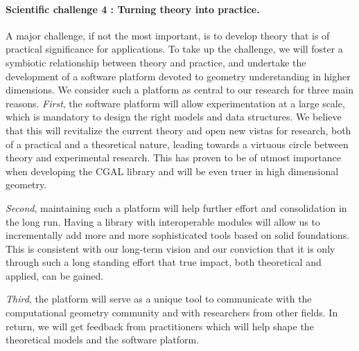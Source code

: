 \paragraph{Scientific challenge 4 : Turning theory into practice.}%
A major challenge, if not the most important, is to develop theory that is of practical significance for applications.   To take up the challenge, we will foster a symbiotic relationship between theory and practice, and  undertake the development of a software platform devoted to geometry understanding in higher dimensions. 
We consider such a platform as central to our research  for three main reasons.  {\em First}, the software platform will allow experimentation at a large scale, which is mandatory to design the right models and data structures. We believe that this will revitalize the current theory and open new vistas for research, both of a practical and a theoretical nature, leading towards a virtuous circle between theory and experimental research. This has proven to be of utmost importance
when developing the CGAL library and will be even truer in high dimensional geometry.

{\em Second}, maintaining such a platform will help further effort and consolidation in the long run.  Having a library with interoperable modules will allow us to incrementally add more and more sophisticated tools based on solid foundations.  This is consistent with our long-term vision and our conviction that it is only through such a long standing effort that true impact, both theoretical and applied, can be gained.

{\em Third}, the platform will serve as a unique tool to communicate with the computational geometry community and with researchers from other fields. 
 In return, we will get feedback from practitioners which will help shape the theoretical models and the software platform.

